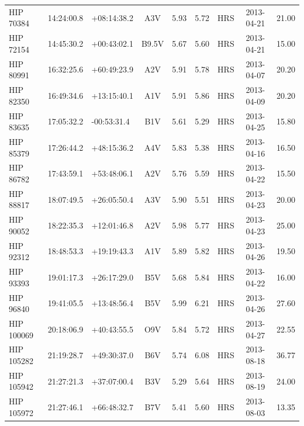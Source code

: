 \begin{scriptsize}
\begin{longtable}{lllcccrcc}
   HIP 70384 &  14:24:00.8 &  +08:14:38.2 &            A3V &     5.93 &     5.72 &        HRS &  2013-04-21 &           21.00 \\
   HIP 72154 &  14:45:30.2 &  +00:43:02.1 &          B9.5V &     5.67 &     5.60 &        HRS &  2013-04-21 &           15.00 \\
   HIP 80991 &  16:32:25.6 &  +60:49:23.9 &            A2V &     5.91 &     5.78 &        HRS &  2013-04-07 &           20.20 \\
   HIP 82350 &  16:49:34.6 &  +13:15:40.1 &            A1V &     5.91 &     5.86 &        HRS &  2013-04-09 &           20.20 \\
   HIP 83635 &  17:05:32.2 &  -00:53:31.4 &            B1V &     5.61 &     5.29 &        HRS &  2013-04-25 &           15.80 \\
   HIP 85379 &  17:26:44.2 &  +48:15:36.2 &            A4V &     5.83 &     5.38 &        HRS &  2013-04-16 &           16.50 \\
   HIP 86782 &  17:43:59.1 &  +53:48:06.1 &            A2V &     5.76 &     5.59 &        HRS &  2013-04-22 &           15.50 \\
   HIP 88817 &  18:07:49.5 &  +26:05:50.4 &            A3V &     5.90 &     5.51 &        HRS &  2013-04-23 &           20.00 \\
   HIP 90052 &  18:22:35.3 &  +12:01:46.8 &            A2V &     5.98 &     5.77 &        HRS &  2013-04-23 &           25.00 \\
   HIP 92312 &  18:48:53.3 &  +19:19:43.3 &            A1V &     5.89 &     5.82 &        HRS &  2013-04-26 &           19.50 \\
   HIP 93393 &  19:01:17.3 &  +26:17:29.0 &            B5V &     5.68 &     5.84 &        HRS &  2013-04-22 &           16.00 \\
   HIP 96840 &  19:41:05.5 &  +13:48:56.4 &            B5V &     5.99 &     6.21 &        HRS &  2013-04-26 &           27.60 \\
  HIP 100069 &  20:18:06.9 &  +40:43:55.5 &            O9V &     5.84 &     5.72 &        HRS &  2013-04-27 &           22.55 \\
  HIP 105282 &  21:19:28.7 &  +49:30:37.0 &            B6V &     5.74 &     6.08 &        HRS &  2013-08-18 &           36.77 \\
  HIP 105942 &  21:27:21.3 &  +37:07:00.4 &            B3V &     5.29 &     5.64 &        HRS &  2013-08-19 &           24.00 \\
  HIP 105972 &  21:27:46.1 &  +66:48:32.7 &            B7V &     5.41 &     5.60 &        HRS &  2013-08-03 &           13.35 \\

\end{longtable}
\end{scriptsize}
